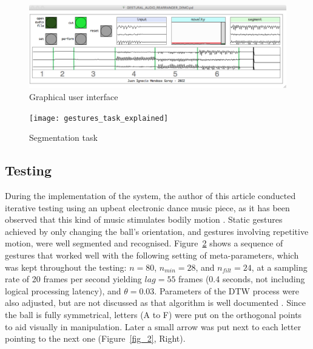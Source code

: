 \documentclass{nime-alternate_ADJ} %
\begin{document}
\begin{figure}[t!]
	\centering
		\includegraphics[trim={0.3cm 1.4cm 0.7cm 1.5cm}, clip=true, width=1\textwidth]{GUI_Cut_task}
\caption{Graphical user interface}
	\label{fig_5}
\end{figure}

\begin{figure}[t!]
	\centering
		\texttt{[image: gestures\_task\_explained]}
	\caption{Segmentation task}
	\label{fig_6}
\end{figure}


\subsection{Testing}\label{Testing}

During the implementation of the system, the author of this article conducted iterative testing using an upbeat electronic dance music piece, as it has been observed that this kind of music stimulates bodily motion  \cite{Burger_Toiviainen_2020}. Static gestures achieved by only changing the ball's orientation, and gestures involving repetitive motion, were well segmented and recognised.  Figure~\ref{fig_6} shows a sequence of gestures that worked well with the following setting of meta-parameters, which was kept throughout the testing: $n = 80$, $n_{min} = 28$, and $n_{filt} = 24$, at a sampling rate of 20 frames per second yielding $lag = 55$ frames (0.4 seconds, not including logical processing latency), and $\theta = 0.03$. Parameters of the DTW process were also adjusted, but are not discussed as that algorithm is well documented \cite{Gillian_etal_2011, Wekinator_website}. Since the ball is fully symmetrical, letters (A to F) were put on the orthogonal points to aid visually in manipulation. Later a small arrow was put next to each letter pointing to the next one (Figure~\ref{fig_2}, Right).  
\end{document}
